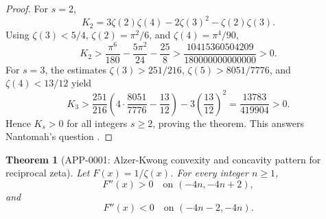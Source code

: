\documentclass[11pt]{article}
\numberwithin{equation}{section}
\newtheorem{theorem}{Theorem}[section]
\theoremstyle{definition}
\theoremstyle{remark}
\newcommand{\1}{\mathbf 1}
\begin{document}
\begin{proof}
For \(s=2\),
\begin{equation}
\label{eq:nantomah-k2}
K_2=3\zeta(2)\zeta(4)-2\zeta(3)^2-\zeta(2)\zeta(3).
\end{equation}
Using \(\zeta(3)<5/4\), \(\zeta(2)=\pi^2/6\), and \(\zeta(4)=\pi^4/90\),
\begin{equation}
\label{eq:nantomah-k2-bound}
K_2>
\frac{\pi^6}{180}-\frac{5\pi^2}{24}-\frac{25}{8}
>
\frac{10415360504209}{180000000000000}>0.
\end{equation}
For \(s=3\), the estimates \(\zeta(3)>251/216\), \(\zeta(5)>8051/7776\), and \(\zeta(4)<13/12\) yield
\begin{equation}
\label{eq:nantomah-k3-bound}
K_3>
\frac{251}{216}
\left(4\cdot\frac{8051}{7776}-\frac{13}{12}\right)
-3\left(\frac{13}{12}\right)^2
=\frac{13783}{419904}>0.
\end{equation}
Hence \(K_s>0\) for all integers \(s\ge2\), proving the theorem.  This answers Nantomah's question \cite{nantomah}.
\end{proof}

\begin{theorem}[APP-0001: Alzer-Kwong convexity and concavity pattern for reciprocal zeta]
\label{thm:alzer-kwong}
Let \(F(x)=1/\zeta(x)\).  For every integer \(n\ge1\),
\begin{equation}
\label{eq:alzer-kwong-convex}
F''(x)>0\quad\text{on }(-4n,-4n+2),
\end{equation}
and
\begin{equation}
\label{eq:alzer-kwong-concave}
F''(x)<0\quad\text{on }(-4n-2,-4n).
\end{equation}
\end{theorem}
\end{document}
